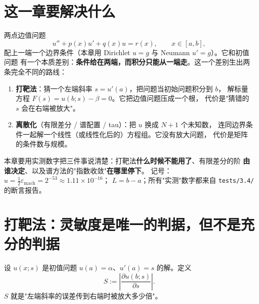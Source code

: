 

\section{这一章要解决什么}

两点边值问题
\begin{equation}
  u''+p(x)u'+q(x)u=r(x),\qquad x\in[a,b],
  \label{eq:bvp}
\end{equation}
配上一端一个边界条件（本章用 Dirichlet $u=g$ 与 Neumann $u'=g$）。它和初值问题
有一个本质差别：\textbf{条件给在两端，而积分只能从一端走}。这一个差别生出两条完全不同的路线：

\begin{enumerate}
  \item \textbf{打靶法}：猜一个左端斜率 $s=u'(a)$，把问题当初始问题积分到 $b$，
        解标量方程 $F(s)=u(b;s)-\beta=0$。它把边值问题压成一个根，
        代价是"猜错的 $s$ 会在右端被放大"。
  \item \textbf{离散化}（有限差分 / 谱配置 / tau）：把 $u$ 换成 $N+1$ 个未知数，
        连同边界条件一起解一个线性（或线性化后的）方程组。它没有放大问题，
        代价是矩阵的条件数与规模。
\end{enumerate}

本章要用实测数字把三件事说清楚：打靶法\textbf{什么时候不能用了}、有限差分的阶
\textbf{由谁决定}、以及谱方法的"指数收敛"\textbf{在哪里停下}。
记号：$u=\tfrac12\varepsilon_{\text{mach}}=2^{-53}\approx1.11\times10^{-16}$；
$L=b-a$；所有"实测"数字都来自 \texttt{tests/3.4/} 的断言报告。

\section{打靶法：灵敏度是唯一的判据，但不是充分的判据}

\begin{definition}[打靶灵敏度]
设 $u(x;s)$ 是初值问题 $u(a)=\alpha$、$u'(a)=s$ 的解。定义
\begin{equation}
  S:=\left|\frac{\partial u(b;s)}{\partial s}\right|.
  \label{eq:sens}
\end{equation}
$S$ 就是"左端斜率的误差传到右端时被放大多少倍"。
\end{definition}

